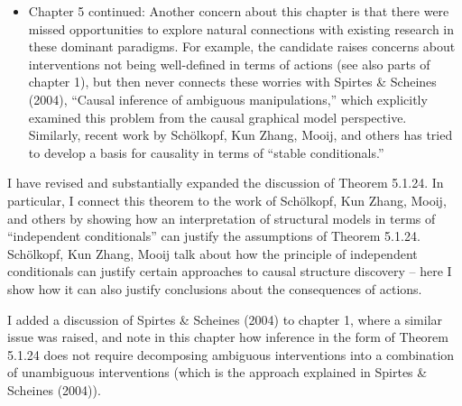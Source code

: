 \documentclass[12pt, a4paper]{article}
\begin{document}
\begin{itemize}
    \item Chapter 5 continued: Another concern about this chapter is that there were missed opportunities to explore natural connections with existing research in these dominant paradigms. For example, the candidate raises concerns about interventions not being well-defined in terms of actions (see also parts of chapter 1), but then never connects these worries with Spirtes \& Scheines (2004), “Causal inference of ambiguous manipulations,” which explicitly examined this problem from the causal graphical model perspective. Similarly, recent work by Schölkopf, Kun Zhang, Mooij, and others has tried to develop a basis for causality in terms of “stable conditionals.”
\end{itemize}

I have revised and substantially expanded the discussion of Theorem 5.1.24. In particular, I connect this theorem to the work of Schölkopf, Kun Zhang, Mooij, and others by showing how an interpretation of structural models in terms of ``independent conditionals'' can justify the assumptions of Theorem 5.1.24. Schölkopf, Kun Zhang, Mooij talk about how the principle of independent conditionals can justify certain approaches to causal structure discovery -- here I show how it can also justify conclusions about the consequences of actions.

I added a discussion of Spirtes \& Scheines (2004) to chapter 1, where a similar issue was raised, and note in this chapter how inference in the form of Theorem 5.1.24 does not require decomposing ambiguous interventions into a combination of unambiguous interventions (which is the approach explained in Spirtes \& Scheines (2004)).
\end{document}
